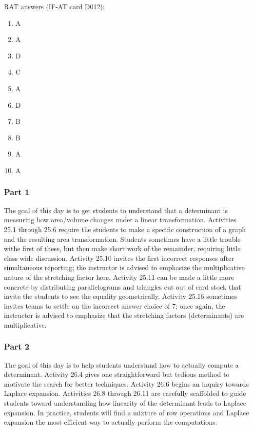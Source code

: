 \documentclass{article}
\begin{document}
RAT answers (IF-AT card D012):
\begin{multicols}{10}
\begin{enumerate}[1)]
\item A
\item A
\item D
\item C
\item A
\item D
\item B
\item B
\item A
\item A
\end{enumerate}
\end{multicols}

\subsubsection*{Part 1}
The goal of this day is to get students to understand that a determinant is measuring how area/volume changes under a linear transformation.  Activities 25.1 through 25.6 require the students to make a specific construction of a graph and the resulting area transformation.  Students sometimes have a little trouble withe first of these, but then make short work of the remainder, requiring little class wide discussion.  Activity 25.10 invites the first incorrect responses after simultaneous reporting; the instructor is advised to emphasize the multiplicative nature of the stretching factor here.  Activity 25.11 can be made a little more concrete by distributing parallelograms and triangles cut out of card stock that invite the students to see the equality geometrically.  Activity 25.16 sometimes invites teams to settle on the incorrect answer choice of 7; once again, the instructor is advised to emphasize that the stretching factors (determinants) are multiplicative.

\subsubsection*{Part 2}
The goal of this day is to help students understand how to actually compute a determinant.  Activity 26.4 gives one straightforward but tedious method to motivate the search for better techniques.  Activity 26.6 begins an inquiry towards Laplace expansion.  Activities 26.8 through 26.11 are carefully scaffolded to guide students toward understanding how linearity of the determinant leads to Laplace expansion.  In practice, students will find a mixture of row operations and Laplace expansion the most efficient way to actually perform the computations.
\end{document}
